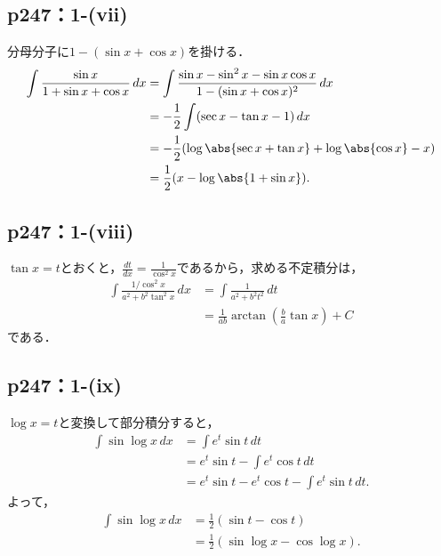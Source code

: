 \documentclass[a4paper,10pt,fleqn]{ltjsarticle}
\begin{document}
      \subsection*{p247：1-(vii)}

    \begin{leftbar}
        分母分子に$1-(\sin x + \cos x)$を掛ける．
        \begin{align*}
          \int \frac{\sin x}{1 + \sin x + \cos x} \,dx
          &= \int \frac{\sin x - \sin^2 x - \sin x\cos x}{1-(\sin x + \cos x)^2} \,dx \\
          &= -\frac{1}{2} \int (\sec x - \tan x - 1) \,dx \\
          &= -\frac{1}{2}(\log \abs{\sec x + \tan x} + \log \abs{\cos x} - x) \\
          &= \frac{1}{2}(x - \log \abs{1 + \sin x}).
        \end{align*}
      \end{leftbar}

\subsection*{p247：1-(viii)}



\begin{tleftbar}
    $\tan x = t$とおくと，$\frac{dt}{dx}= \frac{1}{\cos ^2 x}$であるから，求める不定積分は，
    \begin{align*} 
        \int \frac{1/\cos ^2 x}{a^2 + b^2 \tan ^2 x} \, dx & = \int \frac{1}{a^2+b^2 t^2} \, dt \\
        & = \frac{1}{ab} \arctan \left (\frac{b}{a} \tan x \right)+ C
    \end{align*}
    である．
\end{tleftbar}



\subsection*{p247：1-(ix)}
\begin{leftbar}
    $\log x = t$と変換して部分積分すると，
    \begin{align*}
      \int \sin \log x \,dx
      &= \int e^t \sin t \,dt \\
      &= e^t \sin t - \int e^t \cos t \,dt \\
      &= e^t \sin t - e^t \cos t - \int e^t \sin t \,dt.
    \end{align*}
    よって，
    \begin{align*}
      \int \sin \log x \,dx
      &= \frac{1}{2}(\sin t - \cos t) \\
      &= \frac{1}{2}(\sin \log x - \cos \log x).
    \end{align*}
  \end{leftbar}
\end{document}
